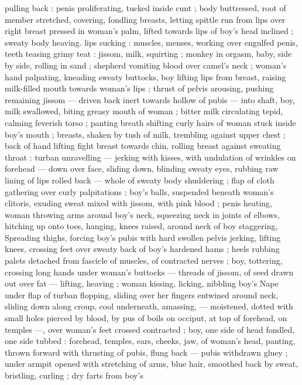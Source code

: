 pulling back : penis proliferating, tucked inside cunt ; body 
buttressed, root of member stretched, covering, fondling breasts, 
letting spittle run from lips over right breast pressed in woman's 
palm, lifted towards lips of boy's head inclined ; sweaty body 
heaving. lips sucking : muscles, menses, working over engulfed 
penis, teeth teasing grimy teat : jissom, milk, squirting ; monkey in 
orgasm, baby, side by side, rolling in sand ; shepherd vomiting blood 
over camel's neck ; woman's hand palpating, kneading sweaty 
buttocks, boy lifting lips from breast, raising milk-filled mouth 
towards woman's lips ; thrust of pelvis arousing, pushing remaining 
jissom --- driven back inert towards hollow of pubis --- into shaft, 
boy, milk swallowed, biting greasy mouth of woman ; bitter milk 
circulating tepid, calming feverish torso ; panting breath shifting 
curly hairs of woman stuck inside boy's mouth ; breasts, shaken by 
tush of milk, trembling against upper chest ; back of hand lifting 
fight breast towards chin, rolling breast against sweating throat : 
turban unravelling --- jerking with kisses, with undulation of wrinkles 
on forehead --- down over face, sliding down, blinding sweaty eyes, 
rubbing raw lining of lips rolled back --- whole of sweaty body 
shuddering ; flap of cloth gathering over curly palpitations ; boy's 
balls, suspended beneath woman's clitoris, exuding sweat mixed with 
jissom, with pink blood ; penis heating, woman throwing arms around 
boy's neck, squeezing neck in joints of elbows, hitching up onto 
toes, hanging, knees raised, around neck of boy staggering, 
Spreading thighs, forcing boy's pubis with hard swollen pelvis 
jerking, lifting knees, crossing feet over sweaty back of boy's 
hardened hams ; heels rubbing palets detached from fascicle of 
muscles, of contracted nerves ; boy, tottering, crossing long hands 
under woman's buttocks --- threads of jissom, of seed drawn out 
over fat --- lifting, heaving ; woman kissing, licking, nibbling boy's 
Nape under flap of turban flopping, sliding over her fingers entwined 
around neck, sliding down along croup, cool underneath, amassing, 
--- moistened, dotted with small holes pierced by blood, by pus of 
boils on occiput, at top of forehead, on temples ---, over woman's 
feet crossed contracted ; boy, one side of head fondled, one side 
tubbed : forehead, temples, ears, cheeks, jaw, of woman's head, 
panting, thrown forward with thrusting of pubis, flung back --- pubis 
withdrawn gluey ; under armpit opened with stretching of arms, blue 
hair, smoothed back by sweat, bristling, curling ; dry farts from boy's 
